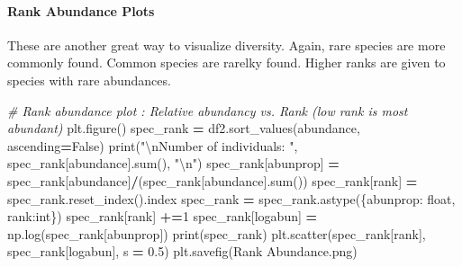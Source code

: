\documentclass[
]{article}
\newenvironment{Shaded}{\begin{snugshade}}{\end{snugshade}}
\newcommand{\BuiltInTok}[1]{#1}
\newcommand{\CharTok}[1]{\textcolor[rgb]{0.31,0.60,0.02}{#1}}
\newcommand{\CommentTok}[1]{\textcolor[rgb]{0.56,0.35,0.01}{\textit{#1}}}
\newcommand{\DecValTok}[1]{\textcolor[rgb]{0.00,0.00,0.81}{#1}}
\newcommand{\FloatTok}[1]{\textcolor[rgb]{0.00,0.00,0.81}{#1}}
\newcommand{\NormalTok}[1]{#1}
\newcommand{\OperatorTok}[1]{\textcolor[rgb]{0.81,0.36,0.00}{\textbf{#1}}}
\newcommand{\StringTok}[1]{\textcolor[rgb]{0.31,0.60,0.02}{#1}}
\newcommand{\VariableTok}[1]{\textcolor[rgb]{0.00,0.00,0.00}{#1}}
\begin{document}
\hypertarget{rank-abundance-plots}{%
\paragraph{Rank Abundance Plots}\label{rank-abundance-plots}}

These are another great way to visualize diversity. Again, rare species
are more commonly found. Common species are rarelky found. Higher ranks
are given to species with rare abundances.

\begin{Shaded}
\begin{Highlighting}[]
\CommentTok{\# Rank abundance plot : Relative abundancy vs. Rank (low rank is most abundant)}
\NormalTok{plt.figure()}
\NormalTok{spec\_rank }\OperatorTok{=}\NormalTok{ df2.sort\_values(}\StringTok{\textquotesingle{}abundance\textquotesingle{}}\NormalTok{, ascending}\OperatorTok{=}\VariableTok{False}\NormalTok{)}
\BuiltInTok{print}\NormalTok{(}\StringTok{"}\CharTok{\textbackslash{}n}\StringTok{Number of individuals: "}\NormalTok{, spec\_rank[}\StringTok{\textquotesingle{}abundance\textquotesingle{}}\NormalTok{].}\BuiltInTok{sum}\NormalTok{(), }\StringTok{"}\CharTok{\textbackslash{}n}\StringTok{"}\NormalTok{)}
\NormalTok{spec\_rank[}\StringTok{\textquotesingle{}abunprop\textquotesingle{}}\NormalTok{] }\OperatorTok{=}\NormalTok{ spec\_rank[}\StringTok{\textquotesingle{}abundance\textquotesingle{}}\NormalTok{]}\OperatorTok{/}\NormalTok{(spec\_rank[}\StringTok{\textquotesingle{}abundance\textquotesingle{}}\NormalTok{].}\BuiltInTok{sum}\NormalTok{())}
\NormalTok{spec\_rank[}\StringTok{\textquotesingle{}rank\textquotesingle{}}\NormalTok{] }\OperatorTok{=}\NormalTok{ spec\_rank.reset\_index().index }
\NormalTok{spec\_rank }\OperatorTok{=}\NormalTok{ spec\_rank.astype(\{}\StringTok{\textquotesingle{}abunprop\textquotesingle{}}\NormalTok{: }\BuiltInTok{float}\NormalTok{, }\StringTok{\textquotesingle{}rank\textquotesingle{}}\NormalTok{:}\BuiltInTok{int}\NormalTok{\})}
\NormalTok{spec\_rank[}\StringTok{\textquotesingle{}rank\textquotesingle{}}\NormalTok{] }\OperatorTok{+=}\DecValTok{1}
\NormalTok{spec\_rank[}\StringTok{\textquotesingle{}logabun\textquotesingle{}}\NormalTok{] }\OperatorTok{=}\NormalTok{ np.log(spec\_rank[}\StringTok{\textquotesingle{}abunprop\textquotesingle{}}\NormalTok{])}
\BuiltInTok{print}\NormalTok{(spec\_rank)}
\NormalTok{plt.scatter(spec\_rank[}\StringTok{\textquotesingle{}rank\textquotesingle{}}\NormalTok{], spec\_rank[}\StringTok{\textquotesingle{}logabun\textquotesingle{}}\NormalTok{], s }\OperatorTok{=} \FloatTok{0.5}\NormalTok{)}
\NormalTok{plt.savefig(}\StringTok{\textquotesingle{}Rank Abundance.png\textquotesingle{}}\NormalTok{)}
\end{Highlighting}
\end{Shaded}
\end{document}

